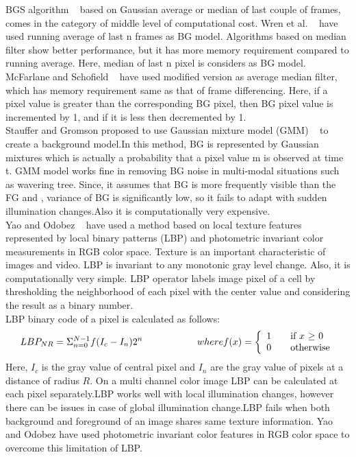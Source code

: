 BGS algorithm ~\cite{10, 12, 13, 14, 15} based on Gaussian average or median of
last couple of frames, comes in the category of middle level of
computational cost. Wren et al. ~\cite{12} have used running average of
last n frames as BG model. Algorithms based on median filter show better
performance, but it has more memory requirement compared to running
average. Here, median of last n pixel is considers as BG model.
McFarlane and Schofield ~\cite{14} have used modified version as average median
filter, which has memory requirement same as that of frame differencing.
Here, if a pixel value is greater than the corresponding BG pixel, then
BG pixel value is incremented by 1, and if it is less then decremented
by 1.\\

 Stauffer and Gromson proposed to use Gaussian mixture model (GMM)
~\cite{15} to create a background model.In this method, BG is
represented by Gaussian mixtures which is actually a probability that a
pixel value m is observed at time t. GMM model works fine in removing BG
noise in multi-modal situations such as wavering tree. Since, it assumes
that BG is more frequently visible than the FG and , variance of BG is
significantly low, so it fails to adapt with sudden illumination
changes.Also it is computationally very expensive.\\ 

Yao and Odobez ~\cite{11} have used a method based on local texture features
represented by local binary patterns (LBP) and photometric invariant
color measurements in RGB color space. Texture is an important
characteristic of images and video. LBP is invariant to any monotonic
gray level change. Also, it is computationally very simple. LBP operator
labels image pixel of a cell by thresholding the neighborhood of each pixel
with the center value and considering the result as a binary number.\\

LBP binary code of a pixel is calculated as follows:
\begin{equation}
LBP_{NR} = \Sigma _{n = 0} ^{N - 1} f(I_c - I_n) 2^n \hspace{20 mm} where f(x) = \left\{ 
  \begin{array}{l l}
     1 & \quad \text{if $x$ $\geq$  $0$}\\
     0 & \quad \text{otherwise}
   \end{array} \right.
\end{equation}
Here, $I_c$ is the gray value of central pixel and $I_n$ are the gray
value of pixels at a distance of radius $R$.  On a multi channel color
image LBP can be calculated at each pixel separately.LBP works well with
local illumination changes, however there can be issues in case of
global illumination change.LBP fails when both background and foreground
of an image shares same texture information. Yao and Odobez have used
photometric invariant color features in RGB color space to overcome this
limitation of LBP.\\

